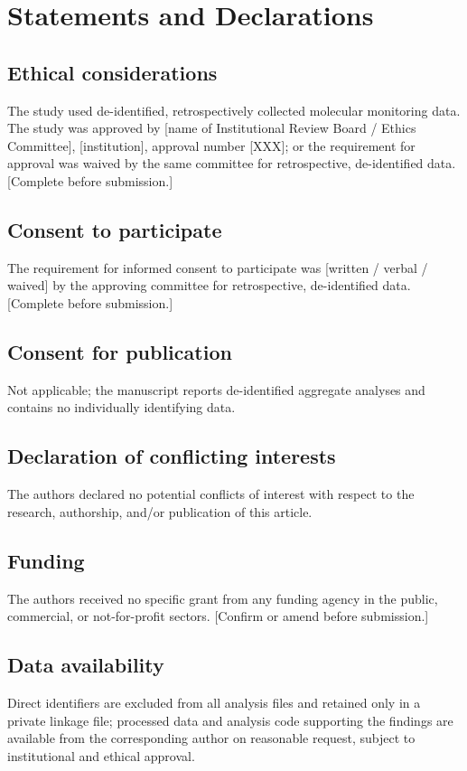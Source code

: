 \documentclass[11pt]{article}
\begin{document}
\section*{Statements and Declarations}

\subsection*{Ethical considerations}
The study used de-identified, retrospectively collected molecular monitoring
data. The study was approved by [name of Institutional Review Board / Ethics
Committee], [institution], approval number [XXX]; or the requirement for
approval was waived by the same committee for retrospective, de-identified
data. [Complete before submission.]

\subsection*{Consent to participate}
The requirement for informed consent to participate was [written / verbal /
waived] by the approving committee for retrospective, de-identified data.
[Complete before submission.]

\subsection*{Consent for publication}
Not applicable; the manuscript reports de-identified aggregate analyses and
contains no individually identifying data.

\subsection*{Declaration of conflicting interests}
The authors declared no potential conflicts of interest with respect to the
research, authorship, and/or publication of this article.

\subsection*{Funding}
The authors received no specific grant from any funding agency in the public,
commercial, or not-for-profit sectors. [Confirm or amend before submission.]

\subsection*{Data availability}
Direct identifiers are excluded from all analysis files and retained only in a
private linkage file; processed data and analysis code supporting the findings
are available from the corresponding author on reasonable request, subject to
institutional and ethical approval.
\end{document}
